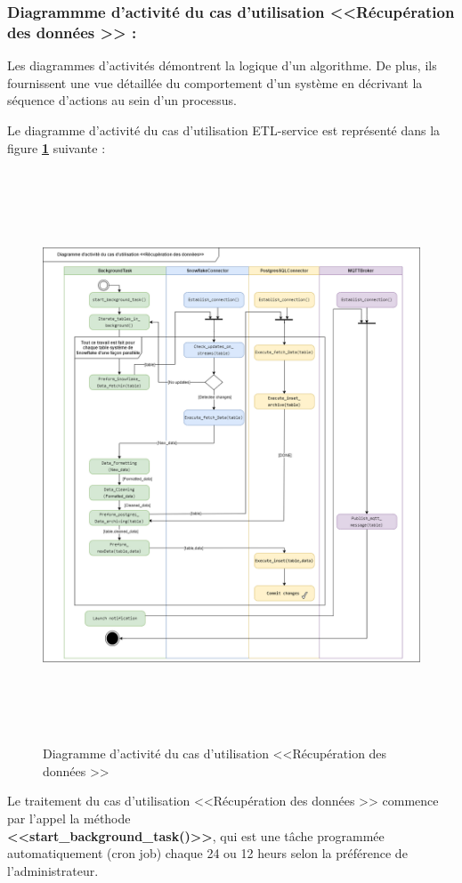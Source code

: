 \subsubsection{Diagrammme d'activité du cas d'utilisation <<Récupération des données >> :}
\par Les diagrammes d'activités démontrent la logique d'un algorithme. De plus, ils fournissent une vue détaillée du comportement d'un système en décrivant la séquence d'actions au sein d'un processus\cite{diag_act}.
\par Le diagramme d'activité du cas d'utilisation ETL-service est représenté dans la figure \textbf{\ref{fig :act}} suivante :
    \begin{figure}[H]
        \centering
        \includegraphics[width=1\linewidth, height=17cm]{img/conception/diag_act_1.png}
        \caption{Diagramme d'activité du cas d'utilisation <<Récupération des données >>}
            \label{fig :act}
        \end{figure}
\par Le traitement du cas d'utilisation <<Récupération des données >> commence par l'appel la méthode \\ \hbox{\textbf{<<start\_background\_task()>>}}, qui est une tâche programmée automatiquement (cron job) chaque 24 ou 12 heurs selon la préférence de l'administrateur.
